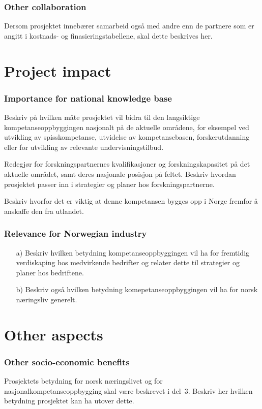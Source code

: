 \documentclass[11pt,a4paper,norsk]{article}
\begin{document}
\section{Other collaboration}
Dersom prosjektet innebærer samarbeid også med andre enn de partnere som er angitt i kostnads- og finasieringstabellene, skal dette beskrives her.

\part{Project impact}

\section{Importance for national knowledge base}
Beskriv på hvilken måte prosjektet vil bidra til den langsiktige kompetanseoppbyggingen nasjonalt på de aktuelle områdene, for eksempel ved utvikling av spisskompetanse, utvidelse av kompetansebasen, forskerutdanning eller for utvikling av relevante undervisningstilbud.

Redegjør for forskningspartnernes kvalifikasjoner og forskningskapasitet på det aktuelle området, samt deres nasjonale posisjon på feltet.
Beskriv hvordan prosjektet passer inn i strategier og planer hos forskningspartnerne.

Beskriv hvorfor det er viktig at denne kompetansen bygges opp i Norge fremfor å anskaffe den fra utlandet.

\section{Relevance for Norwegian industry}
\begin{itemize}
	\item[a)] Beskriv hvilken betydning kompetanseoppbyggingen vil ha for fremtidig verdiskaping hos medvirkende bedrifter og relater dette til strategier og planer hos bedriftene.
	\item[b)] Beskriv også hvilken betydning komepetanseoppbyggingen vil ha for norsk næringsliv generelt. 
\end{itemize}

\part{Other aspects}

\section{Other socio-economic benefits}
Prosjektets betydning for norsk næringslivet og for nasjonalkompetanseoppbygging skal være beskrevet i del~3.
Beskriv her hvilken betydning prosjektet kan ha utover dette. 
\end{document}
